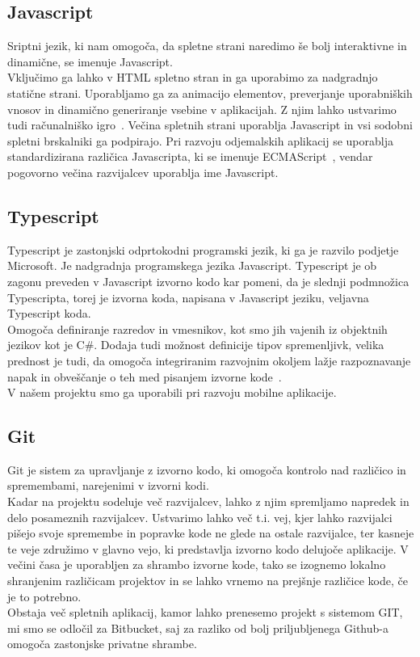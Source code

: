 \documentclass[a4paper, 12pt]{book}
\begin{document}
\subsection{Javascript}
Sriptni jezik, ki nam omogoča, da spletne strani naredimo še bolj interaktivne in dinamične, se imenuje Javascript.\\Vključimo ga lahko v HTML spletno stran in ga uporabimo za nadgradnjo statične strani. Uporabljamo ga za animacijo elementov, preverjanje uporabniških vnosov in dinamično generiranje vsebine v aplikacijah. Z njim lahko ustvarimo tudi računalniško igro~\cite{JSgame}. Večina spletnih strani uporablja Javascript in vsi sodobni spletni brskalniki ga podpirajo. Pri razvoju odjemalskih aplikacij se uporablja standardizirana različica Javascripta, ki se imenuje ECMAScript~\cite{ES}, vendar pogovorno večina razvijalcev uporablja ime Javascript.
\subsection{Typescript}
Typescript je zastonjski odprtokodni programski jezik, ki ga je razvilo podjetje Microsoft. Je nadgradnja programskega jezika Javascript. Typescript je ob zagonu preveden v Javascript izvorno kodo kar pomeni, da je slednji podmnožica Typescripta, torej je izvorna koda, napisana v Javascript jeziku, veljavna Typescript koda.\\Omogoča definiranje razredov in vmesnikov, kot smo jih vajenih iz objektnih jezikov kot je C\#. Dodaja tudi možnost definicije tipov spremenljivk, velika prednost je tudi, da omogoča integriranim razvojnim okoljem lažje razpoznavanje napak in obveščanje o teh med pisanjem izvorne kode~\cite{typescript}.\\
V našem projektu smo ga uporabili pri razvoju mobilne aplikacije.

\subsection{Git}
Git je sistem za upravljanje z izvorno kodo, ki omogoča kontrolo nad različico in spremembami, narejenimi v izvorni kodi.\\Kadar na projektu sodeluje več razvijalcev, lahko z njim spremljamo napredek in delo posameznih razvijalcev. Ustvarimo lahko več t.i. vej, kjer lahko razvijalci pišejo svoje spremembe in popravke kode ne glede na ostale razvijalce, ter kasneje te veje združimo v glavno vejo, ki predstavlja izvorno kodo delujoče aplikacije. V večini časa je uporabljen za shrambo izvorne kode, tako se izognemo lokalno shranjenim različicam projektov in se lahko vrnemo na prejšnje različice kode, če je to potrebno.\\ Obstaja več spletnih aplikacij, kamor lahko prenesemo projekt s sistemom GIT, mi smo se odločil za Bitbucket, saj za razliko od bolj priljubljenega Github-a omogoča zastonjske privatne shrambe.
\end{document}
